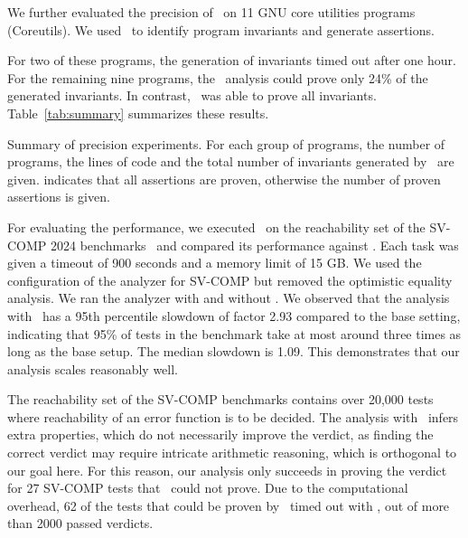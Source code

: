 We further evaluated the precision of \cpo\ on 11 GNU core utilities programs (Coreutils).
We used \cpo\ to identify program invariants and generate assertions.
For two of these programs, the generation of invariants timed out after one hour. %
For the remaining nine programs, the \base\ analysis could prove only 24\% of the generated invariants.
In contrast, \cpo\ was able to prove all invariants.
%
Table~\ref{tab:summary} summarizes these results.

\begin{table}[t]
    \centering
    \caption{Summary of precision experiments. For each group of programs, the number of programs, the lines of code and the total number of invariants generated by \cpo\ are given.
         indicates that all assertions are proven, otherwise the number of proven assertions is given.}
    \label{tab:summary}
    
\end{table}

For evaluating the performance, we executed \cpo\ on the reachability set
of the SV-COMP 2024 benchmarks~\cite{Beyer24} and compared its performance against \base.
Each task was given a timeout of 900 seconds and a memory limit of 15 GB.\@
We used the configuration of the analyzer for SV-COMP but removed the optimistic equality analysis.
We ran the analyzer with and without \cpo.
We observed that the analysis with \cpo\ has a 95th percentile slowdown of factor 2.93 compared to the base setting,
indicating that 95\% of tests in the benchmark take at most around three times as long as the base setup.
The median slowdown is 1.09.
This demonstrates that our analysis scales reasonably well.


The reachability set of the SV-COMP benchmarks contains over 20,000 tests
where reachability of an error function is to be decided.
The analysis with \cpo\ infers extra properties, which do not necessarily improve the verdict,
as finding the correct verdict may require intricate arithmetic reasoning, which is orthogonal to our goal here.
For this reason, our analysis only succeeds in proving the verdict for 27 SV-COMP tests that \base\ could not prove.
Due to the computational overhead, 62 of the tests that could be proven by \base\ timed out with \cpo,
out of more than 2000 passed verdicts.

